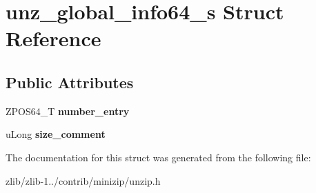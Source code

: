 \hypertarget{structunz__global__info64__s}{\section{unz\+\_\+global\+\_\+info64\+\_\+s Struct Reference}
\label{structunz__global__info64__s}
}
\subsection*{Public Attributes}
\begin{DoxyCompactItemize}
\item 
\hypertarget{structunz__global__info64__s_a628f94ac445f2a6cd64c9e82d481e738}{Z\+P\+O\+S64\+\_\+\+T {\bfseries number\+\_\+entry}}\label{structunz__global__info64__s_a628f94ac445f2a6cd64c9e82d481e738}

\item 
\hypertarget{structunz__global__info64__s_ad9440fb3b019cfdac9ba8b8d83026ffc}{u\+Long {\bfseries size\+\_\+comment}}\label{structunz__global__info64__s_ad9440fb3b019cfdac9ba8b8d83026ffc}

\end{DoxyCompactItemize}


The documentation for this struct was generated from the following file\+:\begin{DoxyCompactItemize}
\item 
zlib/zlib-\/1../contrib/minizip/unzip.\+h\end{DoxyCompactItemize}
